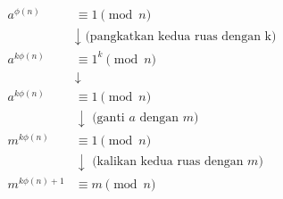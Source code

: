 \documentclass{article}
\begin{document}

\begin{align*}
a^{\phi(n)} &\equiv 1 \pmod{n} \\
&\downarrow \text{ (pangkatkan kedua ruas dengan k)} \\
a^{k\phi(n)} &\equiv 1^k \pmod{n} \\
&\downarrow \\
a^{k\phi(n)} &\equiv 1 \pmod{n} \\
&\downarrow \text{ (ganti $a$ dengan $m$)} \\
m^{k\phi(n)} &\equiv 1 \pmod{n} \\
&\downarrow \text{ (kalikan kedua ruas dengan $m$)} \\
m^{k\phi(n)+1} &\equiv m \pmod{n}
\end{align*}
\end{document}
